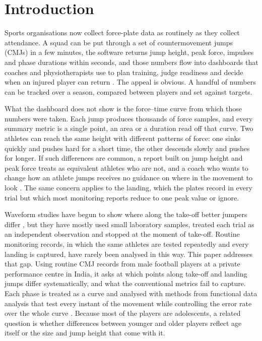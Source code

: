 \section{Introduction}
\label{sec:intro}

Sports organisations now collect force-plate data as routinely as they collect attendance. A squad can be put through a set of countermovement jumps (CMJs) in a few minutes, the software returns jump height, peak force, impulses and phase durations within seconds, and those numbers flow into dashboards that coaches and physiotherapists use to plan training, judge readiness and decide when an injured player can return \parencite{claudino2017,gathercole2015,cormack2008}. The appeal is obvious. A handful of numbers can be tracked over a season, compared between players and set against targets.

What the dashboard does not show is the force--time curve from which those numbers were taken. Each jump produces thousands of force samples, and every summary metric is a single point, an area or a duration read off that curve. Two athletes can reach the same height with different patterns of force: one sinks quickly and pushes hard for a short time, the other descends slowly and pushes for longer. If such differences are common, a report built on jump height and peak force treats as equivalent athletes who are not, and a coach who wants to change how an athlete jumps receives no guidance on where in the movement to look \parencite{mcmahon2018,floria2019}. The same concern applies to the landing, which the plates record in every trial but which most monitoring reports reduce to one peak value or ignore.

Waveform studies have begun to show where along the take-off better jumpers differ \parencite{richter2014,floria2019,parker2018}, but they have mostly used small laboratory samples, treated each trial as an independent observation and stopped at the moment of take-off. Routine monitoring records, in which the same athletes are tested repeatedly and every landing is captured, have rarely been analysed in this way. This paper addresses that gap. Using routine CMJ records from male football players at a private performance centre in India, it asks at which points along take-off and landing jumps differ systematically, and what the conventional metrics fail to capture. Each phase is treated as a curve and analysed with methods from functional data analysis that test every instant of the movement while controlling the error rate over the whole curve \parencite{ramsay2005,pataky2015}. Because most of the players are adolescents, a related question is whether differences between younger and older players reflect age itself or the size and jump height that come with it.

